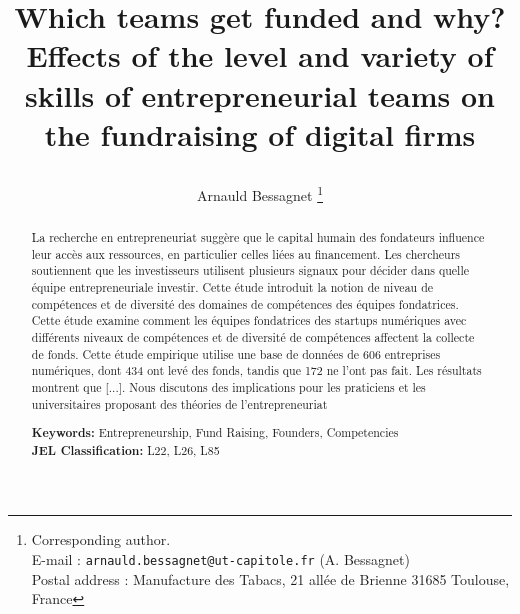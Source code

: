 \documentclass[11pt]{article}
\begin{document}
\vspace{-2em}

\title{
    \begin{minipage}\linewidth
        \centering
        \large{Which teams get funded and why? \\ Effects of the level and variety of skills of entrepreneurial teams on the fundraising of digital firms \vspace{-0.01em}}
    \end{minipage}
}

\date{\vspace{-3ex}}
\author[,1]{\small{Arnauld Bessagnet} \thanks{\scriptsize{Corresponding author.}
\\ \scriptsize{E-mail : \texttt{arnauld.bessagnet@ut-capitole.fr} (A. Bessagnet)}
\\ \scriptsize{Postal address : Manufacture des Tabacs, 21 allée de Brienne 31685 Toulouse, France}}}


\maketitle \vspace{-1,5em}

\begin{abstract} \vspace{0em}

\noindent \footnotesize{La recherche en entrepreneuriat suggère que le capital humain des fondateurs influence leur accès aux ressources, en particulier celles liées au financement. Les chercheurs soutiennent que les investisseurs utilisent plusieurs signaux pour décider dans quelle équipe entrepreneuriale investir. Cette étude introduit la notion de niveau de compétences et de diversité des domaines de compétences des équipes fondatrices. Cette étude examine comment les équipes fondatrices des startups numériques avec différents niveaux de compétences et de diversité de compétences affectent la collecte de fonds. Cette étude empirique utilise une base de données de 606 entreprises numériques, dont 434 ont levé des fonds, tandis que 172 ne l'ont pas fait. Les résultats montrent que [...]. Nous discutons des implications pour les praticiens et les universitaires proposant des théories de l'entrepreneuriat}\\

\begin{obeylines}
\noindent \footnotesize{}{\textbf{Keywords:} Entrepreneurship, Fund Raising, Founders, Competencies}
\noindent \footnotesize{\textbf{JEL Classification:} L22, L26, L85}
\end{obeylines}

\end{abstract}
\end{document}
